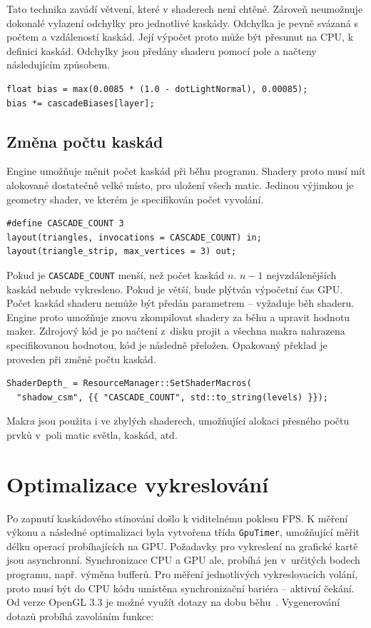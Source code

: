\documentclass[thesis=M,czech]{FITthesis}[2019/12/23]
\begin{document}
Tato technika zavádí větvení, které v shaderech není chtěné. Zároveň neumožnuje dokonalé vylazení odchylky pro jednotlivé kaskády. Odchylka je pevně svázaná s počtem a vzdáleností kaskád. Její výpočet proto může být přesunut na CPU, k definici kaskád. Odchylky jsou předány shaderu pomocí pole a načteny následujícím způsobem.

\begin{verbatim}
float bias = max(0.0085 * (1.0 - dotLightNormal), 0.00085);
bias *= cascadeBiases[layer];
\end{verbatim}

\subsection{Změna počtu kaskád}

Engine umožňuje měnit počet kaskád při běhu programu. Shadery proto musí mít alokované dostatečně velké místo, pro uložení všech matic. Jedinou vý\-jim\-kou je geometry shader, ve kterém je specifikován počet vyvolání.

\begin{verbatim}
#define CASCADE_COUNT 3
layout(triangles, invocations = CASCADE_COUNT) in;
layout(triangle_strip, max_vertices = 3) out;
\end{verbatim}

Pokud je \texttt{CASCADE\_COUNT} menší, než počet kaskád $n$. $n - 1$ nejvzdálenějších kaskád nebude vykresleno. Pokud je větší, bude plýtván výpočetní čas GPU. Počet kaskád shaderu nemůže být předán parametrem -- vyžaduje běh shaderu. Engine proto umožňuje znovu zkompilovat shadery za běhu a upravit hodnotu maker. Zdrojový kód je po načtení z~disku projit a všechna makra nahrazena specifikovanou hodnotou, kód je následně přeložen. Opakovaný překlad je proveden při změně počtu kaskád.

\begin{verbatim}
ShaderDepth_ = ResourceManager::SetShaderMacros(
  "shadow_csm", {{ "CASCADE_COUNT", std::to_string(levels) }});
\end{verbatim}

Makra jsou použita i ve zbylých shaderech, umožňující alokaci přesného počtu prvků v~poli matic světla, kaskád, atd.

\section{Optimalizace vykreslování}

Po zapnutí kaskádového stínování došlo k viditelnému poklesu FPS. K měření výkonu a následné optimalizaci byla vytvořena třída \texttt{GpuTimer}, umožňující měřit délku operací probíhajících na GPU. Požadavky pro vykreslení na grafické kartě jsou asynchronní. Synchronizace CPU a GPU ale, probíhá jen v~určitých bodech programu, např. výměna bufferů. Pro měření jednotlivých vykreslovacích volání, proto musí být do CPU kódu umístěna synchronizační bariéra -- aktivní čekání. Od verze OpenGL 3.3 je možné využít dotazy na dobu běhu~\cite{timer}. Vygenerování dotazů probíhá zavoláním funkce: 
\end{document}
